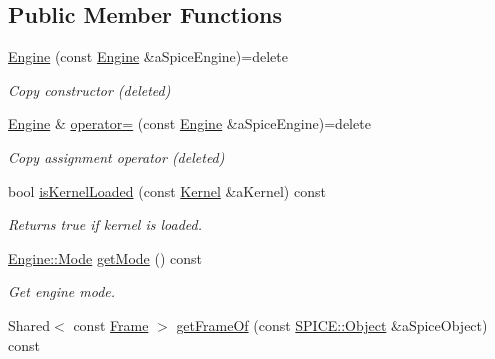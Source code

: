 \subsection*{Public Member Functions}
\begin{DoxyCompactItemize}
\item 
\hyperlink{classlibrary_1_1physics_1_1env_1_1ephem_1_1spice_1_1_engine_a26bf9260d2730a6825a975c1a0b49b5b}{Engine} (const \hyperlink{classlibrary_1_1physics_1_1env_1_1ephem_1_1spice_1_1_engine}{Engine} \&a\+Spice\+Engine)=delete
\begin{DoxyCompactList}\small\item\em Copy constructor (deleted) \end{DoxyCompactList}\item 
\hyperlink{classlibrary_1_1physics_1_1env_1_1ephem_1_1spice_1_1_engine}{Engine} \& \hyperlink{classlibrary_1_1physics_1_1env_1_1ephem_1_1spice_1_1_engine_a6aca23c8962df540725dc0e9fbb3eb47}{operator=} (const \hyperlink{classlibrary_1_1physics_1_1env_1_1ephem_1_1spice_1_1_engine}{Engine} \&a\+Spice\+Engine)=delete
\begin{DoxyCompactList}\small\item\em Copy assignment operator (deleted) \end{DoxyCompactList}\item 
bool \hyperlink{classlibrary_1_1physics_1_1env_1_1ephem_1_1spice_1_1_engine_a36cc8408d86696192a623eb4bc4f41cc}{is\+Kernel\+Loaded} (const \hyperlink{classlibrary_1_1physics_1_1env_1_1ephem_1_1spice_1_1_kernel}{Kernel} \&a\+Kernel) const
\begin{DoxyCompactList}\small\item\em Returns true if kernel is loaded. \end{DoxyCompactList}\item 
\hyperlink{classlibrary_1_1physics_1_1env_1_1ephem_1_1spice_1_1_engine_a2d185a63bce354bff9ad38810410eab4}{Engine\+::\+Mode} \hyperlink{classlibrary_1_1physics_1_1env_1_1ephem_1_1spice_1_1_engine_a50990662e08401c21b369365b332cd2e}{get\+Mode} () const
\begin{DoxyCompactList}\small\item\em Get engine mode. \end{DoxyCompactList}\item 
Shared$<$ const \hyperlink{classlibrary_1_1physics_1_1coord_1_1_frame}{Frame} $>$ \hyperlink{classlibrary_1_1physics_1_1env_1_1ephem_1_1spice_1_1_engine_af5bdad7a3783f772b726ac3f0cd09957}{get\+Frame\+Of} (const \hyperlink{classlibrary_1_1physics_1_1env_1_1ephem_1_1_s_p_i_c_e_a86f1a863677210ba8884807cc725c0f8}{S\+P\+I\+C\+E\+::\+Object} \&a\+Spice\+Object) const

\end{DoxyCompactItemize}
